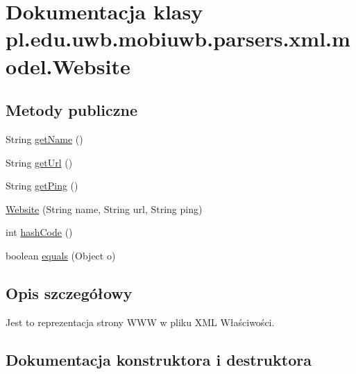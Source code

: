 \hypertarget{classpl_1_1edu_1_1uwb_1_1mobiuwb_1_1parsers_1_1xml_1_1model_1_1_website}{}\section{Dokumentacja klasy pl.\+edu.\+uwb.\+mobiuwb.\+parsers.\+xml.\+model.\+Website}
\label{classpl_1_1edu_1_1uwb_1_1mobiuwb_1_1parsers_1_1xml_1_1model_1_1_website}
\subsection*{Metody publiczne}
\begin{DoxyCompactItemize}
\item 
String \hyperlink{classpl_1_1edu_1_1uwb_1_1mobiuwb_1_1parsers_1_1xml_1_1model_1_1_website_ab8100ca69527eeb16d8f8bbb8428b4d0}{get\+Name} ()
\item 
String \hyperlink{classpl_1_1edu_1_1uwb_1_1mobiuwb_1_1parsers_1_1xml_1_1model_1_1_website_adec7b93a5479de1b7ab5aadd9d9ed92a}{get\+Url} ()
\item 
String \hyperlink{classpl_1_1edu_1_1uwb_1_1mobiuwb_1_1parsers_1_1xml_1_1model_1_1_website_a115f0be731ab212edfaa8a2d2940fad0}{get\+Ping} ()
\item 
\hyperlink{classpl_1_1edu_1_1uwb_1_1mobiuwb_1_1parsers_1_1xml_1_1model_1_1_website_a0ea5487e369b4abc8dde6a39aae2ce49}{Website} (String name, String url, String ping)
\item 
int \hyperlink{classpl_1_1edu_1_1uwb_1_1mobiuwb_1_1parsers_1_1xml_1_1model_1_1_website_aa3bd89e03b70a6f9a1c847bf91fa5f07}{hash\+Code} ()
\item 
boolean \hyperlink{classpl_1_1edu_1_1uwb_1_1mobiuwb_1_1parsers_1_1xml_1_1model_1_1_website_a17c92ca0c7a8b8d82ada360289cf6f26}{equals} (Object o)
\end{DoxyCompactItemize}


\subsection{Opis szczegółowy}
Jest to reprezentacja strony W\+W\+W w pliku X\+M\+L Właściwości. 

\subsection{Dokumentacja konstruktora i destruktora}
\hypertarget{classpl_1_1edu_1_1uwb_1_1mobiuwb_1_1parsers_1_1xml_1_1model_1_1_website_a0ea5487e369b4abc8dde6a39aae2ce49}{}
